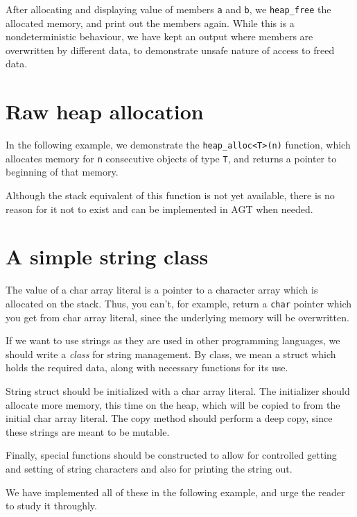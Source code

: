 \documentclass[times, utf8, diplomski]{fer}
\theoremstyle{definition}
\newcommand{\textcode}[3]{
    
}
\begin{document}
After allocating and displaying value of members \texttt{a} and \texttt{b}, 
we \texttt{heap\_free} the allocated memory, and
print out the members again. While this is a nondeterministic behaviour,
we have kept an output where members are overwritten by different data, to demonstrate
unsafe nature of access to freed data.


\section{Raw heap allocation}

In the following example, we demonstrate the \texttt{heap\_alloc<T>(n)} function,
which allocates memory for \texttt{n} consecutive objects of type \texttt{T},
and returns a pointer to beginning of that memory.

\textcode{\resdir/programs/memory_alloc.agt}{memory_alloc}{Raw heap allocation}
\textcode{\resdir/programs/memory_alloc.out}{memory_alloc_out}{Raw heap allocation - output}

Although the stack equivalent of this function is not yet available, there
is no reason for it not to exist and can be implemented in AGT when needed.

\section{A simple string class}

The value of a char array literal is a pointer to a character array
which is allocated on the stack. Thus, you can't, for example, return
a \texttt{char} pointer which you get from char array literal,
since the underlying memory will be overwritten.

If we want to use strings as they are used in other programming languages,
we should write a \textit{class} for string management.
By class, we mean a struct which holds the required data, along with necessary functions for its use.

String struct should be initialized with a char array literal.
The initializer should allocate more memory, this time on the heap,
which will be copied to from the initial char array literal.
The copy method should perform a deep copy, since these strings are meant to be mutable.

Finally, special functions should be constructed to allow for controlled getting and setting of
string characters and also for printing the string out.

We have implemented all of these in the following example, and urge the reader
to study it throughly.
\end{document}
